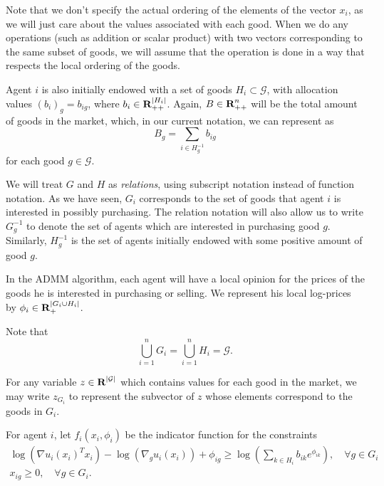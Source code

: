 \documentclass[12pt]{article}
\begin{document}
Note that we don't specify the actual ordering of the elements
of the vector $x_i$, as we will just care about the values associated with
each good.
When we do any operations (such as addition or scalar product) with
two vectors corresponding to the same subset of goods, we will
assume that the operation is done in a way that respects the local ordering of
the goods.

Agent $i$ is also initially endowed with a set of goods
$H_i \subset \mathcal{G}$,
with allocation values $(b_i)_g = b_{ig}$, where $b_i \in {\mbox{\bf R}}_{++}^{|H_i|}$.
Again, $B \in {\mbox{\bf R}}^n_{++}$ will be the total amount of goods in the market, which, in our
current notation, we can represent as
\[
B_g = \sum\limits_{i \in H^{-1}_g} b_{ig}
\]
for each good $g \in \mathcal{G}$.

We will treat $G$ and $H$ as \emph{relations},
using subscript notation instead of function notation.
As we have seen, $G_i$ corresponds to the set of goods that agent $i$ is
interested
in possibly purchasing.
The relation notation will also allow us to
write $G^{-1}_g$ to denote the set of agents which are interested in
purchasing good $g$.
Similarly, $H^{-1}_g$ is the set of agents initially endowed with some
positive amount of good $g$.

In the ADMM algorithm, each agent will have a local opinion for the prices
of the goods he is interested in purchasing or selling.
We represent his local log-prices
by $\phi_i \in {\mbox{\bf R}}_+^{|G_i \cup H_i|}$.

Note that
\[
\bigcup_{i=1}^n G_i = \bigcup_{i=1}^n H_i = \mathcal{G}.
\]

For any variable $z \in {\mbox{\bf R}}^{|\mathcal{G}|}$ which contains values for
each good in the market, we may write $z_{G_i}$ to represent the subvector
of $z$ whose elements correspond to the goods in $G_i$.

For agent $i$, let $f_i(x_i, \phi_i)$ be the indicator function for the
constraints
\[
\begin{array}{c}
\log(\nabla u_i(x_i)^T x_i) - \log(\nabla_g u_i(x_i)) + \phi_{ig} \geq  \log\left(\sum\limits_{k \in H_i} b_{ik} e^{\phi_{ik}}\right),\quad \forall g \in G_i\\
x_{ig} \geq 0, \quad \forall g \in G_i.
\end{array}
\]
\end{document}
